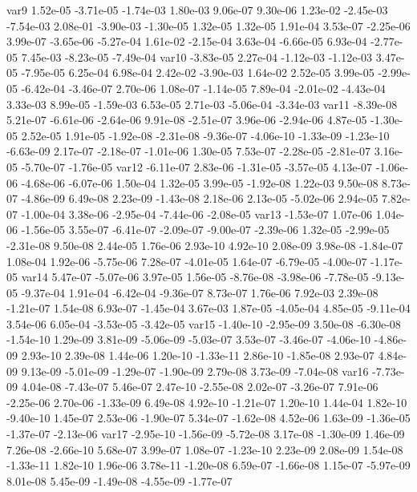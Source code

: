 var9  1.52e-05 -3.71e-05 -1.74e-03  1.80e-03  9.06e-07  9.30e-06  1.23e-02 -2.45e-03 -7.54e-03  2.08e-01 -3.90e-03 -1.30e-05  1.32e-05  1.32e-05  1.91e-04  3.53e-07 -2.25e-06  3.99e-07 -3.65e-06 -5.27e-04  1.61e-02 -2.15e-04  3.63e-04 -6.66e-05  6.93e-04 -2.77e-05  7.45e-03 -8.23e-05 -7.49e-04
var10 -3.83e-05  2.27e-04 -1.12e-03 -1.12e-03  3.47e-05 -7.95e-05  6.25e-04  6.98e-04  2.42e-02 -3.90e-03  1.64e-02  2.52e-05  3.99e-05 -2.99e-05 -6.42e-04 -3.46e-07  2.70e-06  1.08e-07 -1.14e-05  7.89e-04 -2.01e-02 -4.43e-04  3.33e-03  8.99e-05 -1.59e-03  6.53e-05  2.71e-03 -5.06e-04 -3.34e-03
var11 -8.39e-08  5.21e-07 -6.61e-06 -2.64e-06  9.91e-08 -2.51e-07  3.96e-06 -2.94e-06  4.87e-05 -1.30e-05  2.52e-05  1.91e-05 -1.92e-08 -2.31e-08 -9.36e-07 -4.06e-10 -1.33e-09 -1.23e-10 -6.63e-09  2.17e-07 -2.18e-07 -1.01e-06  1.30e-05  7.53e-07 -2.28e-05 -2.81e-07  3.16e-05 -5.70e-07 -1.76e-05
var12 -6.11e-07  2.83e-06 -1.31e-05 -3.57e-05  4.13e-07 -1.06e-06 -4.68e-06 -6.07e-06  1.50e-04  1.32e-05  3.99e-05 -1.92e-08  1.22e-03  9.50e-08  8.73e-07 -4.86e-09  6.49e-08  2.23e-09 -1.43e-08  2.18e-06  2.13e-05 -5.02e-06  2.94e-05  7.82e-07 -1.00e-04  3.38e-06 -2.95e-04 -7.44e-06 -2.08e-05
var13 -1.53e-07  1.07e-06  1.04e-06 -1.56e-05  3.55e-07 -6.41e-07 -2.09e-07 -9.00e-07 -2.39e-06  1.32e-05 -2.99e-05 -2.31e-08  9.50e-08  2.44e-05  1.76e-06  2.93e-10  4.92e-10  2.08e-09  3.98e-08 -1.84e-07  1.08e-04  1.92e-06 -5.75e-06  7.28e-07 -4.01e-05  1.64e-07 -6.79e-05 -4.00e-07 -1.17e-05
var14  5.47e-07 -5.07e-06  3.97e-05  1.56e-05 -8.76e-08 -3.98e-06 -7.78e-05 -9.13e-05 -9.37e-04  1.91e-04 -6.42e-04 -9.36e-07  8.73e-07  1.76e-06  7.92e-03  2.39e-08 -1.21e-07  1.54e-08  6.93e-07 -1.45e-04  3.67e-03  1.87e-05 -4.05e-04  4.85e-05 -9.11e-04  3.54e-06  6.05e-04 -3.53e-05 -3.42e-05
var15 -1.40e-10 -2.95e-09  3.50e-08 -6.30e-08 -1.54e-10  1.29e-09  3.81e-09 -5.06e-09 -5.03e-07  3.53e-07 -3.46e-07 -4.06e-10 -4.86e-09  2.93e-10  2.39e-08  1.44e-06  1.20e-10 -1.33e-11  2.86e-10 -1.85e-08  2.93e-07  4.84e-09  9.13e-09 -5.01e-09 -1.29e-07 -1.90e-09  2.79e-08  3.73e-09 -7.04e-08
var16 -7.73e-09  4.04e-08 -7.43e-07  5.46e-07  2.47e-10 -2.55e-08  2.02e-07 -3.26e-07  7.91e-06 -2.25e-06  2.70e-06 -1.33e-09  6.49e-08  4.92e-10 -1.21e-07  1.20e-10  1.44e-04  1.82e-10 -9.40e-10  1.45e-07  2.53e-06 -1.90e-07  5.34e-07 -1.62e-08  4.52e-06  1.63e-09 -1.36e-05 -1.37e-07 -2.13e-06
var17 -2.95e-10 -1.56e-09 -5.72e-08  3.17e-08 -1.30e-09  1.46e-09  7.26e-08 -2.66e-10  5.68e-07  3.99e-07  1.08e-07 -1.23e-10  2.23e-09  2.08e-09  1.54e-08 -1.33e-11  1.82e-10  1.96e-06  3.78e-11 -1.20e-08  6.59e-07 -1.66e-08  1.15e-07 -5.97e-09  8.01e-08  5.45e-09 -1.49e-08 -4.55e-09 -1.77e-07
